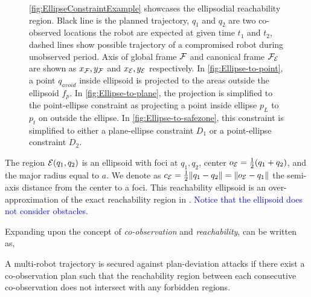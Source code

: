 \documentclass[10pt,twocolumn,twoside]{IEEEtran}
\newcommand{\new}[1]{\textcolor{blue}{#1}}
\begin{document}
\begin{figure}
    \caption{ \cref{fig:EllipseConstraintExample} showcases the ellipsodial reachability region. Black line is the planned trajectory, $q_1$ and $q_2$ are two co-observed locations the robot are expected at given time $t_1$ and $t_2$, dashed lines show possible trajectory of a compromised robot during unobserved period. Axis of global frame $\mathcal{F}$ and canonical frame $\mathcal{F}_{\mathcal{E}}$ are shown as $x_{\mathcal{F}}, y_{\mathcal{F}}$ and $x_{\mathcal{E}}, y_{\mathcal{E}}$ respectively. 
    In \cref{fig:Ellipse-to-point}, a point $q_{avoid}$ inside ellipsoid is projected to the areas outside the ellipsoid $f_{p}$. 
    In \cref{fig:Ellipse-to-plane}, the projection is simplified to the point-ellipse constraint as projecting a point inside ellipse $p_{L}$ to $p_{t}$ on outside the ellipse.
    In \cref{fig:Ellipse-to-safezone}, this constraint is simplified to either a plane-ellipse constraint $D_{1}$ or a point-ellipse constraint $D_{2}$.}
    \label{fig:Reachability_full}
  \end{figure}

The region $\mathcal{E}(q_1,q_2)$ is an ellipsoid with foci at $q_1,q_2$, center $o_{\mathcal{E}} = \frac{1}{2}(q_1+q_2)$, and the major radius equal to $a$. We denote as $c_{\mathcal{E}}=\frac{1}{2}\lVert q_1-q_2\rVert=\lVert o_{\mathcal{E}}-q_1\rVert$ the semi-axis distance from the center to a foci. This reachability ellipsoid is an over-approximation of the exact reachability region in . \new{Notice that the ellipsoid does not consider obstacles}.

Expanding upon the concept of \emph{co-observation} and \emph{reachability},  can be written as,
\begin{remark}\label{rmk:revised-security}
  A multi-robot trajectory is secured against plan-deviation attacks if there exist a co-observation plan such that the reachability region between each consecutive co-observation does not intersect with any forbidden regions.
\end{remark}
\end{document}
